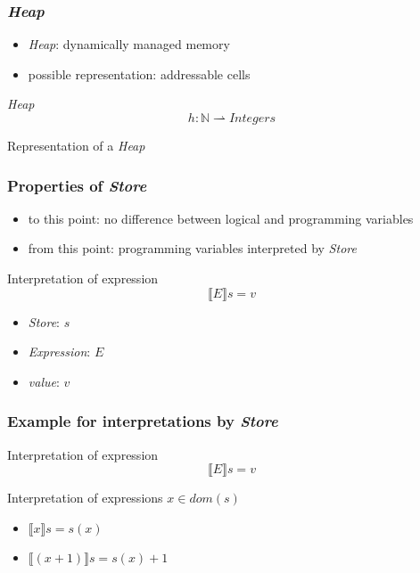 \documentclass{beamer}
\begin{document}
	\begin{frame}[fragile]
	\frametitle{\emph{Heap}}

	\begin{itemize}
		\item \emph{Heap}: dynamically managed memory
		\item possible representation: addressable cells
	\end{itemize}
	\begin{block}{\emph{Heap}}
		$$h: \mathbb{N} \rightharpoonup \textit{Integers}$$
	\end{block}
	\begin{exampleblock}{Representation of a \emph{Heap}}
	\begin{center}
	\end{center}
	\end{exampleblock}

	\end{frame}


	\begin{frame}
	\frametitle{Properties of \emph{Store}}
		\begin{itemize}
			\item to this point: no difference between logical and programming variables
			\item from this point: programming variables interpreted by \emph{Store}
		\end{itemize}
		\begin{block}{Interpretation of expression}
			$$\llbracket E\rrbracket s = v$$
			\begin{itemize}
				\item \emph{Store}: $s$
				\item \emph{Expression}: $E$
				\item \emph{value}: $v$
			\end{itemize}
		\end{block}
	\end{frame}

	\begin{frame}
	\frametitle{Example for interpretations by \emph{Store}}
	\begin{block}{Interpretation of expression}
			$$\llbracket E\rrbracket s = v$$
	\end{block}

	\begin{exampleblock}{Interpretation of expressions}
		$x\in \textit{dom}(s)$
		\begin{itemize}
			\item $\llbracket x\rrbracket s = s(x)$
			\item $\llbracket (x + 1)\rrbracket s = s(x) + 1$
		\end{itemize}
	\end{exampleblock}

	\end{frame}
\end{document}
